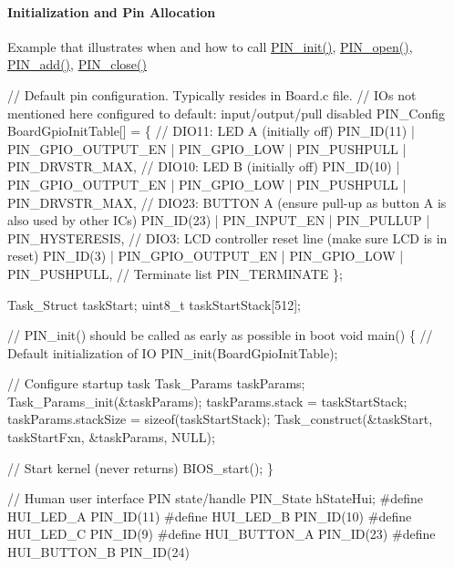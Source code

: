 \paragraph*{Initialization and Pin Allocation}

Example that illustrates when and how to call \hyperlink{_p_i_n_8h_a0de1df98a14e6e13b16db414e54472ef}{P\+I\+N\+\_\+init()}, \hyperlink{_p_i_n_8h_a731c5bb641ffeb064579432adfc8dba0}{P\+I\+N\+\_\+open()}, \hyperlink{_p_i_n_8h_ae96b7cc445336d52f8f6db762ff80156}{P\+I\+N\+\_\+add()}, \hyperlink{_p_i_n_8h_a877e82b9c5333a122cc408e103feba68}{P\+I\+N\+\_\+close()} 
\begin{DoxyCode}
\textcolor{comment}{// Default pin configuration. Typically resides in Board.c file.}
\textcolor{comment}{// IOs not mentioned here configured to default: input/output/pull disabled}
PIN_Config BoardGpioInitTable[] = \{
    \textcolor{comment}{// DIO11: LED A (initially off)}
    PIN_ID(11) | PIN_GPIO_OUTPUT_EN | PIN_GPIO_LOW | PIN_PUSHPULL | 
      PIN_DRVSTR_MAX,
    \textcolor{comment}{// DIO10: LED B (initially off)}
    PIN_ID(10)  | PIN_GPIO_OUTPUT_EN | PIN_GPIO_LOW | PIN_PUSHPULL | 
      PIN_DRVSTR_MAX,
    \textcolor{comment}{// DIO23: BUTTON A (ensure pull-up as button A is also used by other ICs)}
    PIN_ID(23) | PIN_INPUT_EN  | PIN_PULLUP | PIN_HYSTERESIS,
    \textcolor{comment}{// DIO3: LCD controller reset line (make sure LCD is in reset)}
    PIN_ID(3)  | PIN_GPIO_OUTPUT_EN | PIN_GPIO_LOW | PIN_PUSHPULL,
    \textcolor{comment}{// Terminate list}
    PIN_TERMINATE
\};

Task\_Struct taskStart;
uint8\_t     taskStartStack[512];

\textcolor{comment}{// PIN\_init() should be called as early as possible in boot}
\textcolor{keywordtype}{void} main() \{
    \textcolor{comment}{// Default initialization of IO}
    PIN_init(BoardGpioInitTable);

    \textcolor{comment}{// Configure startup task}
    Task\_Params taskParams;
    Task\_Params\_init(&taskParams);
    taskParams.stack = taskStartStack;
    taskParams.stackSize = \textcolor{keyword}{sizeof}(taskStartStack);
    Task\_construct(&taskStart, taskStartFxn, &taskParams, NULL);

    \textcolor{comment}{// Start kernel (never returns)}
    BIOS\_start();
\}

\textcolor{comment}{// Human user interface PIN state/handle}
PIN_State  hStateHui;
\textcolor{preprocessor}{#define HUI\_LED\_A     PIN\_ID(11)}
\textcolor{preprocessor}{#define HUI\_LED\_B     PIN\_ID(10)}
\textcolor{preprocessor}{#define HUI\_LED\_C     PIN\_ID(9)}
\textcolor{preprocessor}{#define HUI\_BUTTON\_A  PIN\_ID(23)}
\textcolor{preprocessor}{#define HUI\_BUTTON\_B  PIN\_ID(24)}


\end{DoxyCode}
